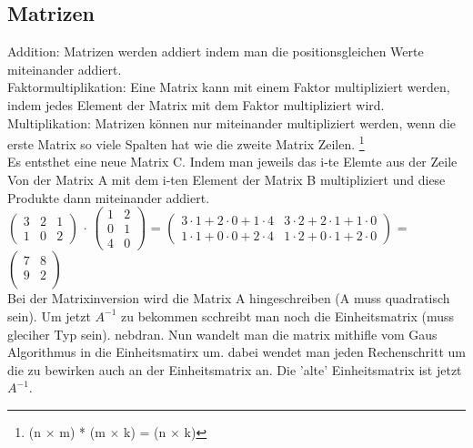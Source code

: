 \documentclass[a4paper,10pt]{scrartcl}
\begin{document}
        \subsection{Matrizen}
            Addition: Matrizen werden addiert indem man die positionsgleichen Werte miteinander addiert. \\
            Faktormultiplikation: Eine Matrix kann mit einem Faktor multipliziert werden, indem jedes Element der Matrix mit dem Faktor multipliziert wird. \\
            Multiplikation: Matrizen können nur miteinander multipliziert werden, wenn die erste Matrix so viele Spalten hat wie die zweite Matrix Zeilen. \footnote{(n $\times$ m) * (m $\times$ k) = (n $\times$ k)} \\
            Es entsthet eine neue Matrix C. Indem man jeweils das i-te Elemte aus der Zeile Von der Matrix A mit dem i-ten Element der Matrix B multipliziert und diese Produkte dann miteinander addiert. \\
            $\begin{pmatrix}
                3 & 2 & 1 \\
                1 & 0 & 2
            \end{pmatrix}$
            $\cdot$
            $\begin{pmatrix}
                1 & 2 \\
                0 & 1 \\
                4 & 0
            \end{pmatrix}$
            = 
            $\begin{pmatrix}
                3 \cdot 1 + 2 \cdot 0 + 1 \cdot 4 & 3 \cdot 2 + 2 \cdot 1 + 1 \cdot 0  \\
                1 \cdot 1 + 0 \cdot 0 + 2 \cdot 4 & 1 \cdot 2 + 0 \cdot 1 + 2 \cdot 0 
            \end{pmatrix}$
            = $\begin{pmatrix}
                7 & 8 \\
                9 & 2 \\
            \end{pmatrix}$ \\
            Bei der Matrixinversion wird die Matrix A hingeschreiben (A muss quadratisch sein). Um jetzt $A^{-1}$ zu bekommen scchreibt man noch die Einheitsmatrix (muss gleciher Typ sein).
            nebdran. Nun wandelt man die matrix mithifle vom Gaus Algorithmus in die Einheitsmatirx um. dabei wendet man jeden Rechenschritt um die zu bewirken auch an der Einheitsmatrix an. 
            Die 'alte' Einheitsmatrix ist jetzt $A^{-1}$.
            \newpage
\end{document}
